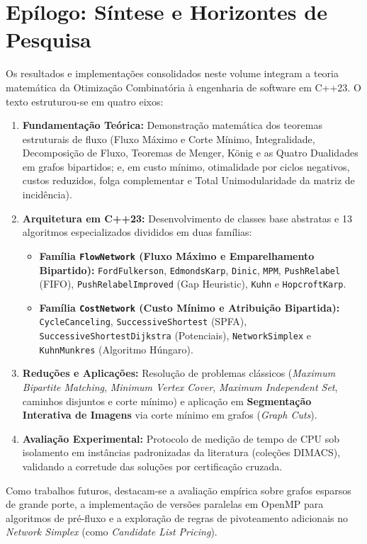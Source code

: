 \chapter*{Epílogo: Síntese e Horizontes de Pesquisa}\label{sec:conclusoes}

Os resultados e implementações consolidados neste volume integram a teoria matemática da Otimização Combinatória à engenharia de software em C++23. O texto estruturou-se em quatro eixos:

\begin{enumerate}[leftmargin=1.5em, itemsep=0.4em]
    \item \textbf{Fundamentação Teórica:} Demonstração matemática dos teoremas estruturais de fluxo (Fluxo Máximo e Corte Mínimo, Integralidade, Decomposição de Fluxo, Teoremas de Menger, König e as Quatro Dualidades em grafos bipartidos; e, em custo mínimo, otimalidade por ciclos negativos, custos reduzidos, folga complementar e Total Unimodularidade da matriz de incidência).

    \item \textbf{Arquitetura em C++23:} Desenvolvimento de classes base abstratas e 13 algoritmos especializados divididos em duas famílias:
    \begin{itemize}
        \item \textbf{Família \lstinline{FlowNetwork} (Fluxo Máximo e Emparelhamento Bipartido):} \lstinline{FordFulkerson}, \lstinline{EdmondsKarp}, \lstinline{Dinic}, \lstinline{MPM}, \lstinline{PushRelabel} (FIFO), \lstinline{PushRelabelImproved} (Gap Heuristic), \lstinline{Kuhn} e \lstinline{HopcroftKarp}.
        \item \textbf{Família \lstinline{CostNetwork} (Custo Mínimo e Atribuição Bipartida):} \lstinline{CycleCanceling}, \lstinline{SuccessiveShortest} (SPFA), \lstinline{SuccessiveShortestDijkstra} (Potenciais), \lstinline{NetworkSimplex} e \lstinline{KuhnMunkres} (Algoritmo Húngaro).
    \end{itemize}

    \item \textbf{Reduções e Aplicações:} Resolução de problemas clássicos (\textit{Maximum Bipartite Matching}, \textit{Minimum Vertex Cover}, \textit{Maximum Independent Set}, caminhos disjuntos e corte mínimo) e aplicação em \textbf{Segmentação Interativa de Imagens} via corte mínimo em grafos (\textit{Graph Cuts}).

    \item \textbf{Avaliação Experimental:} Protocolo de medição de tempo de CPU sob isolamento em instâncias padronizadas da literatura (coleções DIMACS), validando a corretude das soluções por certificação cruzada.
\end{enumerate}

Como trabalhos futuros, destacam-se a avaliação empírica sobre grafos esparsos de grande porte, a implementação de versões paralelas em OpenMP para algoritmos de pré-fluxo e a exploração de regras de pivoteamento adicionais no \textit{Network Simplex} (como \textit{Candidate List Pricing}).


